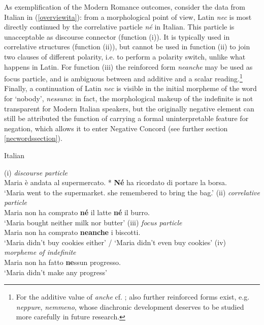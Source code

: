 \documentclass[output=paper,modfonts,nonflat,citecolor=brown,
showindex
]{langsci/langscibook}
\begin{document}
\noindent As exemplification of the Modern Romance outcomes, consider the data from Italian in (\ref{overviewita}): from a morphological point of view, Latin {\em{nec}} is most directly continued by the correlative particle {\em{n\'e}} in Italian. This particle is unacceptable as discourse connector (function (i)). It is typically used in correlative structures (function (ii)), but cannot be used in function (ii) to join two clauses of different polarity, i.e. to perform a polarity switch, unlike what happens in Latin. For function (iii) the reinforced form {\em{neanche}} may be used as focus particle, and is ambiguous between and additive and a scalar reading.{\footnote{For the additive value of {\em{anche}} cf. \citet[]{Francoetal16b}; also further reinforced forms exist, e.g. {\em{neppure}}, {\em{nemmeno}}, whose diachronic development deserves to be studied more carefully in future research.}} Finally, a continuation of Latin {\em{nec}} is visible in the initial morpheme of the word for `nobody', {\em{nessuno}}: in fact, the morphological makeup of the indefinite is not transparent for Modern Italian speakers, but the originally negative element can still be attributed the function of carrying a formal uninterpretable feature for negation, which allows it to enter Negative Concord (see further section \ref{necwordssection}). 

{\begin{exe}
\ex \label{overviewita} Italian
\begin{xlist}
\ex \label{polswitchfirstex} (i) {\em{discourse particle}}\\
Maria \`e andata al supermercato. * {\bf{N\'e}} ha ricordato di portare la borsa.\\
`Maria went to the supermarket. {} she remembered to bring the bag.'
\ex (ii) {\em{correlative particle}}\\
Maria non ha comprato {\bf{n\'e}} il latte {\bf{n\'e}} il burro.\\
`Maria bought neither milk nor butter'
\ex (iii) {\em{focus particle}}\\
Maria non ha comprato {\bf{neanche}} i biscotti.\\ 
`Maria didn't buy cookies either' / `Maria didn't even buy cookies'
\ex (iv) {\em{morpheme of indefinite}}\\
Maria non ha fatto {\bf{ne}}ssun progresso.\\
`Maria didn't make any progress'
\end{xlist}
\end{exe}}
\end{document}
